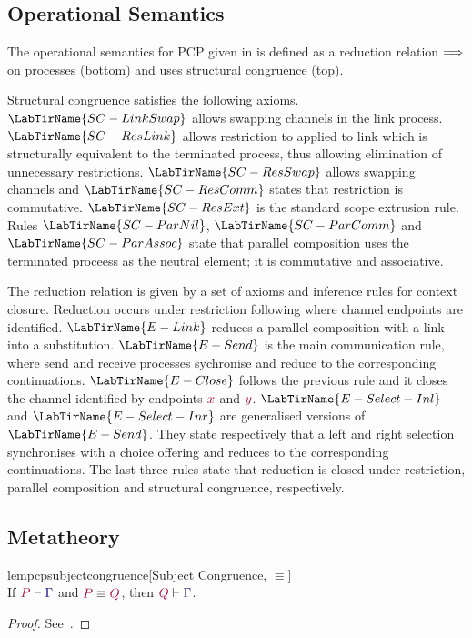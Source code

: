 \documentclass[main.tex]{subfiles}
\begin{document}
\subsection{Operational Semantics}


The operational semantics for PCP given in  is defined as a reduction relation $\Longrightarrow$ on processes (bottom) and uses structural congruence (top).

Structural congruence satisfies the following axioms. $\LabTirName{SC-LinkSwap}$ allows swapping channels in the link process. $\LabTirName{SC-ResLink}$ allows restriction to applied to link which is structurally equivalent to the terminated process, thus allowing elimination of unnecessary restrictions. $\LabTirName{SC-ResSwap}$ allows swapping channels and $\LabTirName{SC-ResComm}$ states that restriction is commutative. $\LabTirName{SC-ResExt}$ is the standard scope extrusion rule. Rules $\LabTirName{SC-ParNil}$, $\LabTirName{SC-ParComm}$ and $\LabTirName{SC-ParAssoc}$ state that parallel composition uses the terminated proceess as the neutral element; it is commutative and associative.

The reduction relation is given by a set of axioms and inference rules for context closure. Reduction occurs under restriction following \cite{dardha2018} where channel endpoints are identified.
$\LabTirName{E-Link}$ reduces a parallel composition with a link into a substitution. $\LabTirName{E-Send}$ is the main communication rule, where send and receive processes sychronise and reduce to the corresponding continuations. $\LabTirName{E-Close}$ follows the previous rule and it closes the channel identified by endpoints $\tm x$ and $\tm y$. $\LabTirName{E-Select-Inl}$ and $\LabTirName{E-Select-Inr}$ are generalised versions of $\LabTirName{E-Send}$. They state respectively that a left and right selection synchronises with a choice offering and reduces to the corresponding continuations. The last three rules state that reduction is closed under restriction, parallel composition and structural congruence, respectively. 


\subsection{Metatheory}

\begin{restatablelemma}{lempcpsubjectcongruence}[Subject Congruence, $\equiv$]
  \label{lem:pcp-subject-congruence}
  \hfill\\%
  If $\seq{P}{\ty{\Gamma}}$ and $\tm{P}\equiv\tm{Q}$,
  then $\seq{Q}{\ty{\Gamma}}$.
\end{restatablelemma}
\begin{proof}
  See~\cite{dardha2018}.
\end{proof}
\end{document}
